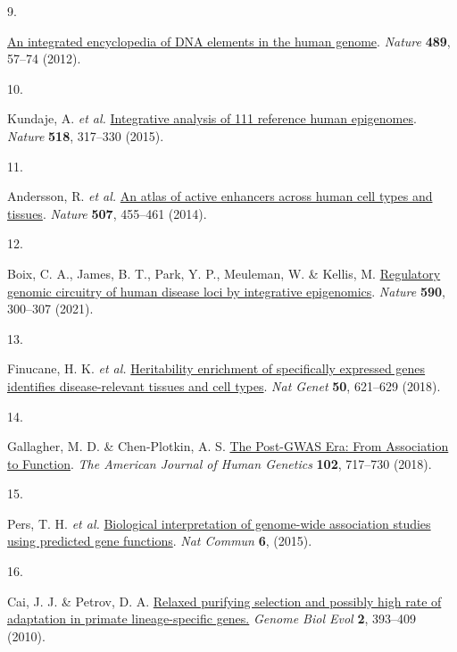 \documentclass[
  a4paper,
]{article}
\newlength{\cslhangindent}
\newlength{\csllabelwidth}
\newlength{\cslentryspacingunit} %
\newenvironment{CSLReferences}[2] %
 {%
  \setlength{\parindent}{0pt}
  \ifodd #1
  \let\oldpar\par
  \def\par{\hangindent=\cslhangindent\oldpar}
  \fi
  \setlength{\parskip}{#2\cslentryspacingunit}
 }%
 {}
\newcommand{\CSLLeftMargin}[1]{\parbox[t]{\csllabelwidth}{#1}}
\newcommand{\CSLRightInline}[1]{\parbox[t]{\linewidth - \csllabelwidth}{#1}\break}
\begin{document}
\begin{CSLReferences}{0}{0}
\leavevmode{}%
\CSLLeftMargin{9. }%
\CSLRightInline{\href{https://doi.org/10.1038/nature11247}{An integrated encyclopedia of DNA elements in the human genome}. \emph{Nature} \textbf{489}, 57--74 (2012).}

\leavevmode{}%
\CSLLeftMargin{10. }%
\CSLRightInline{Kundaje, A. \emph{et al.} \href{https://doi.org/10.1038/nature14248}{Integrative analysis of 111 reference human epigenomes}. \emph{Nature} \textbf{518}, 317--330 (2015).}

\leavevmode{}%
\CSLLeftMargin{11. }%
\CSLRightInline{Andersson, R. \emph{et al.} \href{https://doi.org/10.1038/nature12787}{An atlas of active enhancers across human cell types and tissues}. \emph{Nature} \textbf{507}, 455--461 (2014).}

\leavevmode{}%
\CSLLeftMargin{12. }%
\CSLRightInline{Boix, C. A., James, B. T., Park, Y. P., Meuleman, W. \& Kellis, M. \href{https://doi.org/10.1038/s41586-020-03145-z}{Regulatory genomic circuitry of human disease loci by integrative epigenomics}. \emph{Nature} \textbf{590}, 300--307 (2021).}

\leavevmode{}%
\CSLLeftMargin{13. }%
\CSLRightInline{Finucane, H. K. \emph{et al.} \href{https://doi.org/10.1038/s41588-018-0081-4}{Heritability enrichment of specifically expressed genes identifies disease-relevant tissues and cell types}. \emph{Nat Genet} \textbf{50}, 621--629 (2018).}

\leavevmode{}%
\CSLLeftMargin{14. }%
\CSLRightInline{Gallagher, M. D. \& Chen-Plotkin, A. S. \href{https://doi.org/10.1016/j.ajhg.2018.04.002}{The Post-GWAS Era: From Association to Function}. \emph{The American Journal of Human Genetics} \textbf{102}, 717--730 (2018).}

\leavevmode{}%
\CSLLeftMargin{15. }%
\CSLRightInline{Pers, T. H. \emph{et al.} \href{https://doi.org/10.1038/ncomms6890}{Biological interpretation of genome-wide association studies using predicted gene functions}. \emph{Nat Commun} \textbf{6}, (2015).}

\leavevmode{}%
\CSLLeftMargin{16. }%
\CSLRightInline{Cai, J. J. \& Petrov, D. A. \href{https://doi.org/10.1093/gbe/evq019}{Relaxed purifying selection and possibly high rate of adaptation in primate lineage-specific genes.} \emph{Genome Biol Evol} \textbf{2}, 393--409 (2010).}


\end{CSLReferences}
\end{document}
